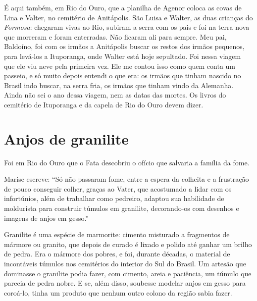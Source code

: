 \documentclass[
  brazilian,
  11pt,
  openany]{book}
\begin{document}
É aqui também, em Rio do Ouro, que a planilha de Agenor coloca as covas
de Lina e Valter, no cemitério de Anitápolis. São Luisa e Walter, as
duas crianças do \emph{Formosa}: chegaram vivas ao Rio, subiram a serra
com os pais e foi na terra nova que morreram e foram enterradas. Não
ficaram ali para sempre. Meu pai, Baldoíno, foi com os irmãos a
Anitápolis buscar os restos dos irmãos pequenos, para levá-los a
Ituporanga, onde Walter está hoje sepultado. Foi nessa viagem que ele
viu neve pela primeira vez. Ele me contou isso como quem conta um
passeio, e só muito depois entendi o que era: os irmãos que tinham
nascido no Brasil indo buscar, na serra fria, os irmãos que tinham vindo
da Alemanha. Ainda não sei o ano dessa viagem, nem as datas das mortes.
Os livros do cemitério de Ituporanga e da capela de Rio do Ouro devem
dizer.

\section{Anjos de granilite}\label{anjos-de-granilite}

Foi em Rio do Ouro que o Fata descobriu o ofício que salvaria a família
da fome.

Marise escreve: ``Só não passaram fome, entre a espera da colheita e a
frustração de pouco conseguir colher, graças ao Vater, que acostumado a
lidar com os infortúnios, além de trabalhar como pedreiro, adaptou sua
habilidade de moldurista para construir túmulos em granilite,
decorando-os com desenhos e imagens de anjos em gesso.''

Granilite é uma espécie de marmorite: cimento misturado a fragmentos de
mármore ou granito, que depois de curado é lixado e polido até ganhar um
brilho de pedra. Era o mármore dos pobres, e foi, durante décadas, o
material de incontáveis túmulos nos cemitérios do interior do Sul do
Brasil. Um artesão que dominasse o granilite podia fazer, com cimento,
areia e paciência, um túmulo que parecia de pedra nobre. E se, além
disso, soubesse modelar anjos em gesso para coroá-lo, tinha um produto
que nenhum outro colono da região sabia fazer.
\end{document}
